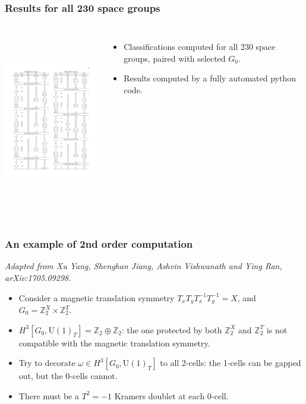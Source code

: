 \documentclass[xcolor=table, 11pt, aspectratio=43]{beamer}
\newcommand{\uone}{\mathrm U(1)}
\begin{document}
\begin{frame}
	\frametitle{Results for all 230 space groups}
	\begin{columns}
		\includegraphics[height=8cm]{bigtable}
		\begin{itemize}
			\item Classifications computed for all 230 space groups, paired with selected $G_0$.
			\item Results computed by a fully automated python code.
		\end{itemize}
	\end{columns}
\end{frame}

\begin{frame}
\frametitle{An example of 2nd order computation}
\emph{\small Adapted from Xu Yang, Shenghan Jiang, Ashvin Vishwanath and Ying Ran, arXiv:1705.09298.}
\begin{itemize}
	\item Consider a magnetic translation symmetry $T_xT_yT_x^{-1}T_y^{-1} = X$, and $G_0=\mathbb Z_2^X\times\mathbb Z_2^T$.
	\item $H^3[G_0,\uone_T]=\mathbb Z_2\oplus\mathbb Z_2$: the one protected by both $\mathbb Z_2^X$ and $\mathbb Z_2^T$ is \alert{not compatible} with the magnetic translation symmetry.
	\item Try to decorate $\omega\in H^3[G_0,\uone_T]$ to all 2-cells: the 1-cells can be gapped out, but the 0-cells \alert{cannot}.
	\item There must be a $T^2=-1$ Kramers doublet at each 0-cell.
\end{itemize}
\begin{center}
\end{center}
\end{frame}
\end{document}
